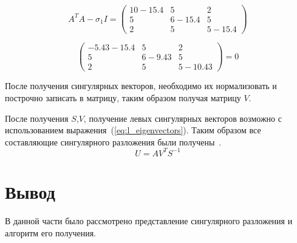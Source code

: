 \begin{equation}
	A^{T}A - \sigma_{1}I = \begin{pmatrix}
		10 - 15.4 & 5 & 2\\ 
		5 & 6 -15.4  &5\\
		2 & 5 & 5 - 15.4
	\end{pmatrix}
	\label{eq:r_eigenvectors_2}
\end{equation}

\begin{equation}
	\begin{pmatrix}
		-5.43 - 15.4 & 5 & 2\\ 
		5 & 6 -9.43  &5\\
		2 & 5 & 5 - 10.43
	\end{pmatrix} = 0
	\label{eq:r_eigenvectors_3}
\end{equation}

После получения сингулярных векторов, необходимо их нормализовать и построчно записать  в матрицу, таким образом получая матрицу $V$.

После получения $S$,$V$, получение левых сингулярных векторов возможно с использованием выражения~(\ref{eq:l_eigenvectors}). Таким образом все составляющие сингулярного разложения были получены~\cite{SVD_algo}.
\begin{equation}
	U = AV^{T}S^{-1}
	\label{eq:l_eigenvectors}
\end{equation}















\section*{Вывод}
В данной части было рассмотрено представление сингулярного разложения и алгоритм его получения.
